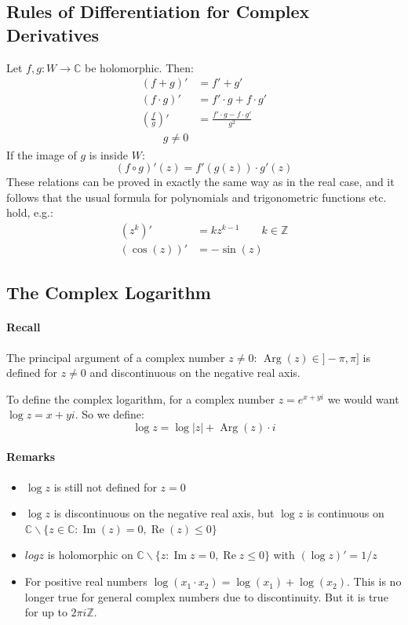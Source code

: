 \subsection{Rules of Differentiation for Complex Derivatives}
Let $f,g:W\to \mathbb{C}$ be holomorphic. Then:
\begin{equation*}
	\begin{split}
		(f+g)' &= f' + g'\\
		(f\cdot g)' &= f'\cdot g + f\cdot g'\\
		(\frac fg)' &= \frac{f'\cdot g - f\cdot g'}{g^2} \\\qquad g\ne 0
	\end{split}
\end{equation*}
If the image of $g$ is inside $W$:
$$
(f\circ g)' (z) = f'(g(z))\cdot  g' (z)
$$
These relations can be proved in exactly the same way as in the real case, and it follows that the usual formula for polynomials and trigonometric functions etc. hold, e.g.:
\begin{equation*}
	\begin{split}
		(z^k)' &= kz^{k-1}\qquad k \in \mathbb{Z}\\
		(\cos(z))' &= -\sin(z)
	\end{split}
\end{equation*}
\subsection{The Complex Logarithm}
\paragraph{Recall}The principal argument of a complex number $z\ne 0$: $\operatorname{Arg}(z)\in]-\pi,\pi]$ is defined for $z\ne0$ and discontinuous on the negative real axis. 

To define the complex logarithm, for a complex number $z=e^{x+yi}$ we would want $\log z = x+yi$. So we define:
\begin{equation*}
	\log z = \log |z| + \operatorname{Arg} (z) \cdot i
\end{equation*}
\paragraph{Remarks}
\begin{itemize}
	\item $\log z$ is still not defined for $z=0$
	\item $\log z$ is discontinuous on the negative real axis, but $\log z$ is continuous on $\mathbb{C}\backslash \{z\in\mathbb{C}:\operatorname{Im}(z)=0,\operatorname{Re}(z)\le 0 \}$
	\item $log z$ is holomorphic on $\mathbb{C} \backslash \{z:\operatorname{Im} z = 0, \operatorname{Re} z \le 0\}$ with $(\log z)' = 1/z$
	\item For positive real numbers $\log(x_1\cdot x_2)=\log(x_1)+\log(x_2)$. This is no longer true for general complex numbers due to discontinuity. But it is true for up to $2\pi i \mathbb{Z}$.
\end{itemize}
